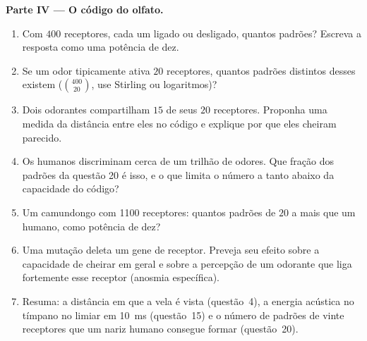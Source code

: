 \begin{problem}
\medskip
\noindent\textbf{Parte IV --- O código do olfato.}
\begin{enumerate}[resume]
  \item Com $400$ receptores, cada um ligado ou desligado, quantos
        padrões? Escreva a resposta como uma potência de dez.
  \item Se um odor tipicamente ativa $20$ receptores, quantos padrões
        distintos desses existem ($\binom{400}{20}$, use Stirling ou
        logaritmos)?
  \item Dois odorantes compartilham $15$ de seus $20$ receptores.
        Proponha uma medida da distância entre eles no código e explique
        por que eles cheiram parecido.
  \item Os humanos discriminam cerca de um trilhão de odores. Que fração
        dos padrões da questão 20 é isso, e o que limita o número a
        tanto abaixo da capacidade do código?
  \item Um camundongo com \num{1100} receptores: quantos padrões de $20$
        a mais que um humano, como potência de dez?
  \item Uma mutação deleta um gene de receptor. Preveja seu efeito sobre
        a capacidade de cheirar em geral e sobre a percepção de um
        odorante que liga fortemente esse receptor (anosmia específica).
  \item Resuma: a distância em que a vela é vista (questão~4), a energia
        acústica no tímpano no limiar em \qty{10}{ms} (questão~15) e o
        número de padrões de vinte receptores que um nariz humano
        consegue formar (questão~20).
\end{enumerate}
\end{problem}
